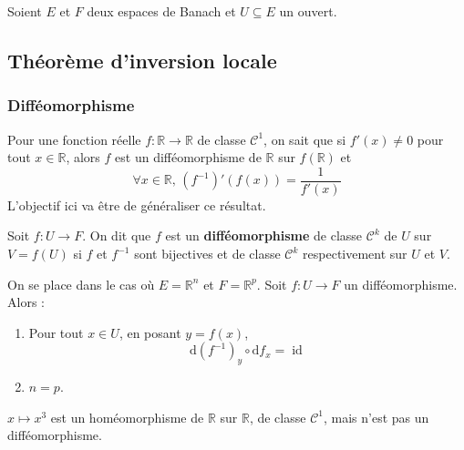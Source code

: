 




  Soient $E$ et $F$ deux espaces de Banach et $U \subseteq E$ un ouvert.

  \subsection{Théorème d'inversion locale}

  \subsubsection{Difféomorphisme}


  Pour une fonction réelle $f : \mathbb{R} \rightarrow \mathbb{R}$ de classe $\mathcal{C}^1$, on sait que si $f'(x) \neq 0$ pour tout $x \in \mathbb{R}$, alors $f$ est un difféomorphisme de $\mathbb{R}$ sur $f(\mathbb{R})$ et
  \[ \forall x \in \mathbb{R}, \, (f^{-1})'(f(x)) = \frac{1}{f'(x)} \]
  L'objectif ici va être de généraliser ce résultat.


  \begin{definition}
    Soit $f : U \rightarrow F$. On dit que $f$ est un \textbf{difféomorphisme} de classe $\mathcal{C}^k$ de $U$ sur $V = f(U)$ si $f$ et $f^{-1}$ sont bijectives et de classe $\mathcal{C}^k$ respectivement sur $U$ et $V$.
  \end{definition}

  \begin{proposition}
    On se place dans le cas où $E = \mathbb{R}^n$ et $F = \mathbb{R}^p$. Soit $f : U \rightarrow F$ un difféomorphisme. Alors :
    \begin{enumerate}[label={\bfseries(\roman*)}]
      \item Pour tout $x \in U$, en posant $y = f(x)$,
      \[ \mathrm{d}(f^{-1})_y \circ \mathrm{d}f_x = \operatorname{id} \]
      \item $n=p$.
    \end{enumerate}
  \end{proposition}

  \begin{example}
    $x \mapsto x^3$ est un homéomorphisme de $\mathbb{R}$ sur $\mathbb{R}$, de classe $\mathcal{C}^1$, mais n'est pas un difféomorphisme.
  \end{example}

